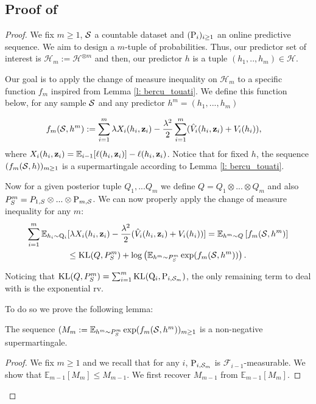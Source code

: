 \subsection{Proof of }
\label{sec: proof_main_thm_online-ht}
 \begin{proof}
   We fix $m\geq 1$, $\S$ a countable dataset and $(\P_{i})_{i\geq 1}$ an online predictive sequence. We aim to design a $m$-tuple of probabilities. Thus, our predictor set of interest is $\mathcal{H}_m:= \mathcal{H}^{\otimes m}$ and then, our predictor $h$ is a tuple $(h_1,..,h_m)\in\mathcal{H}$.

   Our goal is to apply the change of measure inequality on $\mathcal{H}_m$ to a specific function $f_m$ inspired from Lemma \ref{l: bercu_touati}. We define this function below, for any sample $\S$ and any predictor $h^m=(h_1,...,h_m)$

   \begin{align*}
   f_m(\S,h^m) & := \sum_{i=1}^m \lambda X_i(h_i,\z_i)  - \frac{\lambda^2}{2}\sum_{i=1}^m(\hat{V}_i(h_i,\z_i) + V_i(h_i)),
   \end{align*}
   where $X_i(h_i,\z_i)= \mathbb{E}_{i-1}[\ell(h_i,\z_i)]- \ell(h_i,\z_i)$. Notice that for fixed $h$, the sequence $(f_m(\S,h))_{m\geq 1}$ is a supermartingale according to Lemma \ref{l: bercu_touati}.

   Now for a given posterior tuple $Q_1,...Q_m$ we define $Q= Q_1 \otimes ...\otimes Q_m$ and also $P^m_S = P_{1,S}\otimes...\otimes \P_{m,\S}$. We can now properly apply the change of measure inequality for any $m$:
   \begin{multline*}
    \sum_{i=1}^m \mathbb{E}_{h_i\sim \Q_{i}}[\lambda X_i(h_i,\z_i)  - \frac{\lambda^2}{2}(\hat{V}_i(h_i,\z_i) + V_i(h_i))]  = \mathbb{E}_{h^m\sim Q}\left[ f_m(\S,h^m) \right] \\
     \leq \operatorname{KL}(Q,P^m_S) + \log \left( \mathbb{E}_{h^m\sim P^m_S}\exp(f_m(\S,h^m))  \right).
   \end{multline*}
 
   Noticing that $\operatorname{KL}(Q,P^m_S)= \sum_{i=1}^m \operatorname{KL}(\Q_{i},\P_{i,\Sm})$, the only remaining term to deal with is the exponential rv.

   To do so we prove the following lemma:

   \begin{lemma}
     The sequence $(M_m:=\mathbb{E}_{h^m\sim P^m_S}\exp(f_m(\S,h^m))_{m\geq 1}$ is a non-negative supermartingale.
   \end{lemma}
   \begin{proof}
   We fix $m\geq 1$ and we recall that for any $i$, $\P_{i,\Sm}$ is $\mathcal{F}_{i-1}$-measurable. We show that $\mathbb{E}_{m-1}[M_m] \leq M_{m-1}$. We first recover $M_{m-1}$ from $\mathbb{E}_{m-1}[M_m]$.


\end{proof}
\end{proof}
